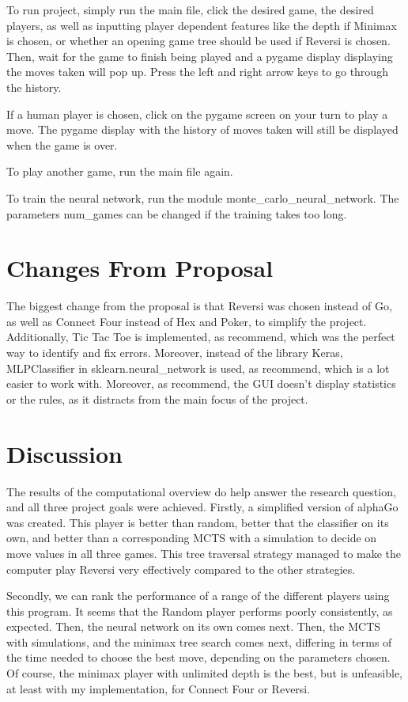 \documentclass[fontsize=11pt]{article}
\begin{document}
To run project, simply run the main file, click the desired game, the desired players, as well as inputting 
player dependent features like the depth if Minimax is chosen, or whether an opening game tree should be used 
if Reversi is chosen. Then, wait for the game to finish being played and a pygame display displaying the moves taken will 
pop up. Press the left and right arrow keys to go through the history.

If a human player is chosen, click on the pygame screen on your turn to play a move. The pygame display with the history
of moves taken will still be displayed when the game is over. 

To play another game, run the main file again.

To train the neural network, run the module monte\_carlo\_neural\_network. The parameters num\_games can be changed 
if the training takes too long.

\section*{Changes From Proposal}

The biggest change from the proposal is that Reversi was chosen instead of Go, as well as Connect Four instead 
of Hex and Poker, to simplify the project. Additionally, Tic Tac Toe is implemented, as recommend, which was the perfect 
way to identify and fix errors. Moreover, instead of the library Keras, MLPClassifier in sklearn.neural\_network
is used, as recommend, which is a lot easier to work with. Moreover, as recommend, the GUI doesn't display 
statistics or the rules, as it distracts from the main focus of the project.

\section*{Discussion}

The results of the computational overview do help answer the research question, and all three 
project goals were achieved. Firstly, a simplified version of alphaGo was created. This player is 
better than random, better that the classifier on its own, and better than a corresponding MCTS with a
simulation to decide on move values in all three games. This tree traversal strategy managed to make the 
computer play Reversi very effectively compared to the other strategies.

Secondly, we can rank the performance of a range of the different players using this program.
It seems that the Random player performs poorly consistently, as expected. Then, 
the neural network on its own comes next. Then, the MCTS with simulations, 
and the minimax tree search comes next, differing in terms of the time needed to choose 
the best move, depending on the parameters chosen. Of course, the minimax player with unlimited 
depth is the best, but is unfeasible, at least with my implementation, for Connect Four or Reversi.
\end{document}
